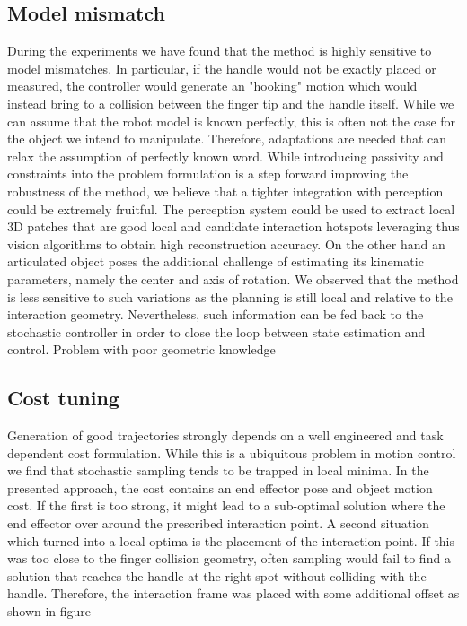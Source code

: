 \subsection{Model mismatch}
During the experiments we have found that the method is highly sensitive to model mismatches. In particular, if the handle would not be exactly placed or measured, the controller would generate an "hooking" motion which would instead bring to a collision between the finger tip and the handle itself. While we can assume that the robot model is known perfectly, this is often not the case for the object we intend to manipulate. Therefore, adaptations are needed that can relax the assumption of perfectly known word. While introducing passivity and constraints into the problem formulation is a step forward improving the robustness of the method, we believe that a tighter integration with perception could be extremely fruitful. The perception system could be used to extract local 3D patches that are good local and candidate interaction hotspots leveraging thus vision algorithms to obtain high reconstruction accuracy. On the other hand an articulated object poses the additional challenge of estimating its kinematic parameters, namely the center and axis of rotation. We observed that the method is less sensitive to such variations as the planning is still local and relative to the interaction geometry. Nevertheless, such information can be fed back to the stochastic controller in order to close the loop between state estimation and control. 
Problem with poor geometric knowledge

\subsection{Cost tuning}
Generation of good trajectories strongly depends on a well engineered and task dependent cost formulation. While this is a ubiquitous problem in motion control we find that stochastic sampling tends to be trapped in local minima. In the presented approach, the cost contains an end effector pose and object motion cost. If the first is too strong, it might lead to a sub-optimal solution where the end effector over around the prescribed interaction point. A second situation which turned into a local optima is the placement of the interaction point. If this was too close to the finger collision geometry, often sampling would fail to find a solution that reaches the handle at the right spot without colliding with the handle. Therefore, the interaction frame was placed with some additional offset as shown in figure 

